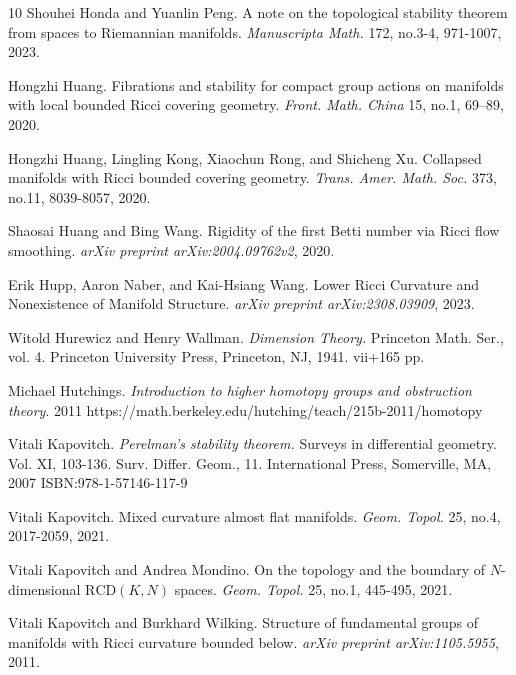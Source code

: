 \documentclass[12pt]{amsart}
\theoremstyle{definition}
\numberwithin{equation}{section}
\newcommand{\rcd}{\text{RCD}}
\begin{document}
\begin{thebibliography}{10}
Shouhei Honda and  Yuanlin Peng.
\newblock A note on the topological stability theorem from spaces to Riemannian manifolds. {\em Manuscripta Math. }172, no.3-4, 971-1007, 2023.


Hongzhi Huang. 
\newblock Fibrations and stability for compact group actions on manifolds with local bounded Ricci covering geometry. {\em Front. Math. China} 15, no.1, 69–89, 2020.

Hongzhi Huang, Lingling Kong, Xiaochun Rong, and Shicheng Xu. 
\newblock Collapsed manifolds with Ricci bounded covering geometry. {\em Trans. Amer. Math. Soc. }373, no.11, 8039-8057, 2020.

Shaosai Huang and  Bing Wang.
\newblock Rigidity of the first Betti number via Ricci flow smoothing. {\em arXiv preprint  arXiv:2004.09762v2}, 2020.

Erik Hupp, Aaron Naber, and Kai-Hsiang  Wang. 
\newblock Lower Ricci Curvature and Nonexistence of Manifold Structure. {\em arXiv preprint  arXiv:2308.03909}, 2023.

Witold Hurewicz and Henry Wallman.   
{\em Dimension Theory.} Princeton Math. Ser., vol. 4. Princeton University Press, Princeton, NJ, 1941. vii+165 pp.

Michael Hutchings. \emph{Introduction to higher homotopy groups and obstruction theory}. 2011  https://math.berkeley.edu/hutching/teach/215b-2011/homotopy


Vitali Kapovitch.
{\em Perelman's stability theorem.} 
Surveys in differential geometry. Vol. XI, 103-136. Surv. Differ. Geom., 11. International Press, Somerville, MA, 2007 ISBN:978-1-57146-117-9


Vitali Kapovitch. 
\newblock Mixed curvature almost flat manifolds. {\em Geom. Topol.} 25, no.4, 2017-2059, 2021.

Vitali Kapovitch and  Andrea Mondino.
\newblock On the topology and the boundary of $N$-dimensional $\rcd (K,N)$  spaces. {\em Geom. Topol. } 25, no.1, 445-495, 2021.


Vitali Kapovitch and  Burkhard  Wilking.
\newblock Structure of fundamental groups of manifolds with Ricci curvature bounded below. {\em arXiv preprint  arXiv:1105.5955}, 2011.


\end{thebibliography}
\end{document}
